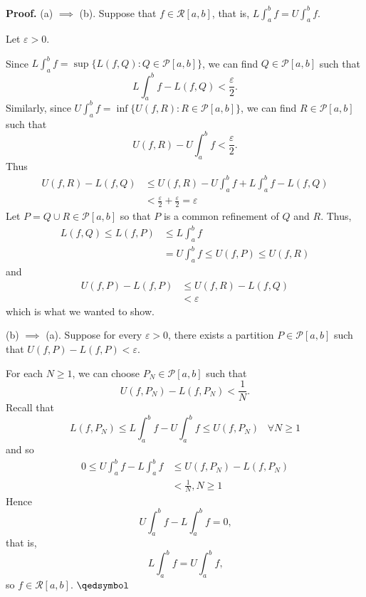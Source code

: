 \documentclass[11pt]{article}
\theoremstyle{definition}
\begin{document}
\textbf{Proof.} (a) $\implies$ (b). Suppose that $f \in \mathcal{R}[a, b]$, that is, $L\int_a^b f = U\int_a^b f$. 

Let $\varepsilon > 0$. 

Since $L\int_a^b f = \sup\{L(f, Q) : Q \in \mathcal{P}[a, b]\}$, we can find $Q \in \mathcal{P}[a, b]$ such that
$$L\int_a^b f - L(f, Q) < \frac{\varepsilon}2 \text{.}$$
Similarly, since $U\int_a^b f = \inf\{U(f, R) : R \in \mathcal{P}[a, b]\}$, we can find $R \in \mathcal{P}[a, b]$ such that
$$U(f, R) - U\int_a^b f < \frac{\varepsilon}2 \text{.}$$
Thus 
\begin{align*}
U(f, R) - L(f, Q) & \leq U(f, R) - U\int_a^b f + L\int_a^b f - L(f, Q) \\
		  	    & < \frac{\varepsilon}2 + \frac{\varepsilon}2 = \varepsilon
\end{align*}
Let $P = Q \cup R \in \mathcal{P}[a, b]$ so that $P$ is a common refinement of $Q$ and $R$. Thus,
\begin{align*}
L(f, Q) \leq L(f, P) & \leq L\int_a^b f \\
				 & = U\int_a^b f \leq U(f, P) \leq U(f, R)
\end{align*}
and
\begin{align*}
U(f, P) - L(f, P) & \leq U(f, R) - L(f, Q) \\
			   & < \varepsilon
\end{align*}
which is what we wanted to show. 

(b) $\implies$ (a). Suppose for every $\varepsilon > 0$, there exists a partition $P \in \mathcal{P}[a, b]$ such that $U(f, P) - L(f, P) < \varepsilon$. 

For each $N \geq 1$, we can choose $P_N \in \mathcal{P}[a, b]$ such that
$$U(f, P_N) - L(f, P_N) < \frac1N \text{.}$$
Recall that
$$L(f, P_N) \leq L\int_a^b f - U\int_a^b f \leq U(f, P_N) \hspace{10pt} \forall N \geq 1$$
and so
\begin{align*}
0 \leq U\int_a^b f - L\int_a^b f & \leq U(f, P_N) - L(f, P_N) \\
							 & < \frac1N, N \geq 1
\end{align*}
Hence
$$U\int_a^b f - L\int_a^b f = 0 \text{,}$$
that is,
$$L\int_a^b f = U\int_a^b f \text{,}$$
so $f \in \mathcal{R}[a, b]$. $\qedsymbol$
\end{document}

